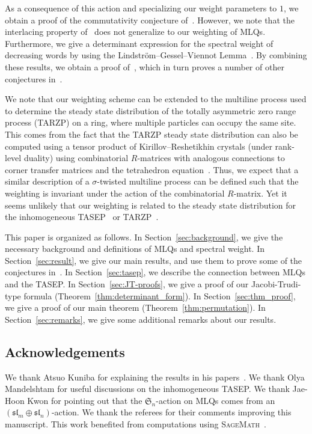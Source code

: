 \documentclass[reqno]{amsart}
\newcommand{\0}{\phantom{c}}
\newcommand{\SymGp}[1]{\mathfrak{S}_{#1}} %
\theoremstyle{plain}
\theoremstyle{definition}
\numberwithin{equation}{section}
\begin{document}
As a consequence of this action and specializing our weight parameters to $1$, we obtain a proof of the commutativity conjecture of~\cite{AAMP}.
However, we note that the interlacing property of~\cite{AAMP} does not generalize to our weighting of MLQs.
Furthermore, we give a determinant expression for the spectral weight of decreasing words by using the Lindstr\"om--Gessel--Viennot Lemma~\cite{GV85,Lindstrom73}.
By combining these results, we obtain a proof of~\cite[Conj.~3.10]{AasLin17}, which in turn proves a number of other conjectures in~\cite{AasLin17}.

We note that our weighting scheme can be extended to the multiline process used to determine the steady state distribution of the totally asymmetric zero range process (TARZP) on a ring, where multiple particles can occupy the same site.
This comes from the fact that the TARZP steady state distribution can also be computed using a tensor product of Kirillov--Reshetikhin crystals (under rank-level duality) using combinatorial $R$-matrices with analogous connections to corner transfer matrices and the tetrahedron equation~\cite{KMO16TARZP,KMO16TARZPII}.
Thus, we expect that a similar description of a $\sigma$-twisted multiline process can be defined such that the weighting is invariant under the action of the combinatorial $R$-matrix.
Yet it seems unlikely that our weighting is related to the steady state distribution for the inhomogeneous TASEP~\cite{AM13,AL14} or TARZP~\cite{KMO16II}.

This paper is organized as follows.
In Section~\ref{sec:background}, we give the necessary background and definitions of MLQs and spectral weight.
In Section~\ref{sec:result}, we give our main results, and use them to prove some of the conjectures in~\cite{AasLin17}.
In Section~\ref{sec:tasep}, we describe the connection between MLQs and the TASEP.
In Section~\ref{sec:JT-proofs}, we give a proof of our Jacobi-Trudi-type formula (Theorem~\ref{thm:determinant_form}).
In Section~\ref{sec:thm_proof}, we give a proof of our main theorem (Theorem~\ref{thm:permutation}).
In Section~\ref{sec:remarks}, we give some additional remarks about our results.


\subsection{Acknowledgements}

We thank Atsuo Kuniba for explaining the results in his papers~\cite{KMO15,KMO16II,KMO16,KMO16TARZP,KMO16TARZPII}.
We thank Olya Mandelshtam for useful discussions on the inhomogeneous TASEP.
We thank Jae-Hoon Kwon for pointing out that the $\SymGp{n}$-action on MLQs comes from an $(\mathfrak{sl}_m \oplus \mathfrak{sl}_n)$-action.
We thank the referees for their comments improving this manuscript.
This work benefited from computations using \textsc{SageMath}~\cite{sage,combinat}.
\end{document}
